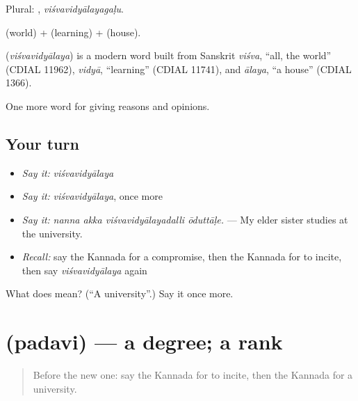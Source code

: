 Plural: , \emph{viśvavidyālayagaḷu}.

 (world) +  (learning) +  (house).

\begin{cousinweb}
\textbf{} (\emph{viśvavidyālaya}) is a modern word built from Sanskrit \emph{viśva}, \textquotedblleft{}all, the world\textquotedblright{} (CDIAL 11962), \emph{vidyā}, \textquotedblleft{}learning\textquotedblright{} (CDIAL 11741), and \emph{ālaya}, \textquotedblleft{}a house\textquotedblright{} (CDIAL 1366).
\end{cousinweb}

\begin{grammarlens}[title={What you've built}]
One more word for giving reasons and opinions.
\end{grammarlens}

\subsection*{Your turn}
\begin{itemize}
\raggedright
  \item \emph{Say it:} \emph{viśvavidyālaya}
  \item \emph{Say it:} \emph{viśvavidyālaya}, once more
  \item \emph{Say it:} \emph{nanna akka viśvavidyālayadalli ōduttāḷe.} — My elder sister studies at the university.
  \item \emph{Recall:} say the Kannada for a compromise, then the Kannada for to incite, then say \emph{viśvavidyālaya} again
\end{itemize}

\begin{tcolorbox}[breakable,colback=teal!4,colframe=teal!35!black,title={Before you move on}]
What does  mean? (\textquotedblleft{}A university\textquotedblright{}.) Say it once more.
\end{tcolorbox}
\section[\texorpdfstring{\kn{ಪದವಿ} (padavi)}{ಪದವಿ (padavi)}]{ (padavi) — a degree; a rank}

\label{lesson:KA-C406-padavi}



\begin{quote}
Before the new one: say the Kannada for to incite, then the Kannada for a university.
\end{quote}

